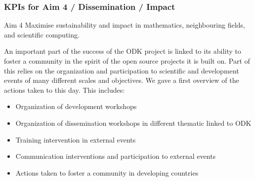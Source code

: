 \begin{enumerate}
\begin{itemize}
\end{itemize}
\end{enumerate}

\subsubsection{KPIs for Aim 4 / Dissemination / Impact}
\begin{recommendation}{Aim 4}
  Maximise sustainability and impact in mathematics, neighbouring fields, and scientific computing.
 \end{recommendation}

An important part of the success of the ODK project is linked to its ability to foster a community in the spirit of the open source projects 
it is built on. Part of this relies on the organization and participation to scientific and development events of many different scales and 
objectives. We gave a first overview of the actions taken to this day. This includes:

 \begin{itemize}
    \item Organization of development workshops
    \item Organization of dissemination workshops in different thematic linked to ODK
    \item Training intervention in external events
    \item Communication interventions and participation to external events
    \item Actions taken to foster a community in developing countries
    \end{itemize}

